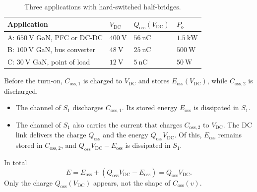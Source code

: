 

\begin{table}[ht]
	\centering
	\begin{tabular}{llll}
		\toprule
		Application                         & $V_\mathrm{DC}$          & $Q_\mathrm{oss}(V_\mathrm{DC})$ & $P_\mathrm{o}$          \\
		\midrule
		A: $\SI{650}{\volt}$ GaN, PFC or DC-DC  & $\SI{400}{\volt}$    & $\SI{56}{\nano\coulomb}$        & $\SI{1.5}{\kilo\watt}$  \\
		B: $\SI{100}{\volt}$ GaN, bus converter & $\SI{48}{\volt}$     & $\SI{25}{\nano\coulomb}$        & $\SI{500}{\watt}$       \\
		C: $\SI{30}{\volt}$ GaN, point of load  & $\SI{12}{\volt}$     & $\SI{5}{\nano\coulomb}$         & $\SI{50}{\watt}$        \\
		\bottomrule
	\end{tabular}
	\caption{Three applications with hard-switched half-bridges.}
	\label{table:ex01_cases}
\end{table}


\begin{solutionblock}
	Before the turn-on, $C_\mathrm{oss,1}$ is charged to $V_\mathrm{DC}$ and stores $E_\mathrm{oss}(V_\mathrm{DC})$, while $C_\mathrm{oss,2}$ is discharged.
	\begin{itemize}
		\item The channel of $S_1$ discharges $C_\mathrm{oss,1}$. Its stored energy $E_\mathrm{oss}$ is dissipated in $S_1$.
		\item The channel of $S_1$ also carries the current that charges $C_\mathrm{oss,2}$ to $V_\mathrm{DC}$. The DC link delivers the charge $Q_\mathrm{oss}$ and the energy $Q_\mathrm{oss}V_\mathrm{DC}$. Of this, $E_\mathrm{oss}$ remains stored in $C_\mathrm{oss,2}$, and $Q_\mathrm{oss}V_\mathrm{DC}-E_\mathrm{oss}$ is dissipated in $S_1$.
	\end{itemize}
	In total
	\begin{equation}
		E = E_\mathrm{oss} + \left(Q_\mathrm{oss}V_\mathrm{DC}-E_\mathrm{oss}\right) = Q_\mathrm{oss}V_\mathrm{DC}.
	\end{equation}
	Only the charge $Q_\mathrm{oss}(V_\mathrm{DC})$ appears, not the shape of $C_\mathrm{oss}(v)$.
\end{solutionblock}

